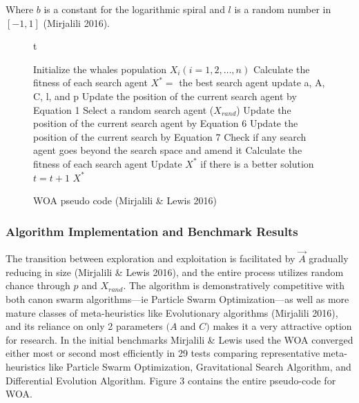 \documentclass[11pt]{article}
\begin{document}
Where $b$ is a constant for the logarithmic spiral and $l$ is a random number in $[-1, 1]$ (Mirjalili 2016).

\begin{figure}{t}
	\caption{WOA pseudo code (Mirjalili \& Lewis 2016)}
	\begin{algorithm}[H]
		\scriptsize
		\begin{algorithmic}[1]
			\STATE Initialize the whales population $X_i(i = 1,2, \dots, n)$
			\STATE Calculate the fitness of each search agent
			\STATE $X^* = $ the best search agent
					\STATE update a, A, C, l, and p
							\STATE Update the position of the current search agent by Equation 1
						\ELSE
							\STATE Select a random search agent ($X_{rand}$)
							\STATE Update the position of the current search agent by Equation 6
						\ENDIF
					\ELSE
						\STATE Update the position of the current search by Equation 7
					\ENDIF
				\ENDFOR
				\STATE Check if any search agent goes beyond the search space and amend it
				\STATE Calculate the fitness of each search agent
				\STATE Update $X^*$ if there is a better solution
				\STATE $t = t+1$
			\ENDWHILE
			\STATE \RETURN $X^*$ 
		\end{algorithmic}
	\end{algorithm}
\end{figure}

\subsubsection*{Algorithm Implementation and Benchmark Results}
The transition between exploration and exploitation is facilitated by $\vec{A}$ gradually reducing in size (Mirjalili \& Lewis 2016), and the entire process utilizes random chance through $p$ and $X_{rand}$.
The algorithm is demonstratively competitive with both canon swarm algorithms---ie Particle Swarm Optimization---as well as more mature classes of meta-heuristics like Evolutionary algorithms (Mirjalili 2016), and its reliance on only 2 parameters $(A$ and $C)$ makes it a very attractive option for research.
In the initial benchmarks Mirjalili \& Lewis used the WOA converged either most or second most efficiently in 29 tests comparing representative meta-heuristics like Particle Swarm Optimization, Gravitational Search Algorithm, and Differential Evolution Algorithm.
Figure 3 contains the entire pseudo-code for WOA.
\end{document}
